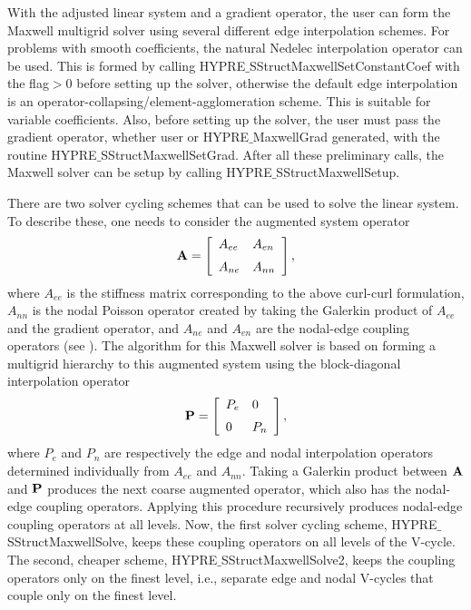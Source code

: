 With the adjusted linear system and a gradient operator, the user can form the Maxwell multigrid solver using 
several different edge interpolation schemes. For problems with smooth coefficients, the natural Nedelec
interpolation operator can be used. This is formed by calling HYPRE$\_$SStructMaxwellSetConstantCoef 
with the flag$>0$ before setting up the solver, otherwise the default edge interpolation is an
operator-collapsing/element-agglomeration scheme. This is suitable for variable coefficients.
Also, before setting up the solver, the user must pass the gradient operator, whether user or 
HYPRE$\_$MaxwellGrad generated, with the routine HYPRE$\_$SStructMaxwellSetGrad. After all these
preliminary calls, the Maxwell solver can be setup by calling HYPRE$\_$SStructMaxwellSetup.

There are two solver cycling schemes that can be used to solve the linear system. To describe these, one
needs to consider the augmented system operator
\begin{eqnarray}
\bf{A}= \left [
  \begin{array}{ll}
     A_{ee} & A_{en}  \\ \rule{0cm}{.5cm}
     A_{ne} & A_{nn}
  \end{array}
\right ],
\end{eqnarray}
where $A_{ee}$ is the stiffness matrix corresponding to the above curl-curl formulation, $A_{nn}$
is the nodal Poisson operator created by taking the Galerkin product of $A_{ee}$ and the gradient operator,
and $A_{ne}$ and $A_{en}$ are the nodal-edge coupling operators (see \cite{JonesLee_2006}). The algorithm
for this Maxwell solver is based on forming a multigrid hierarchy to this augmented system using the block-diagonal
interpolation operator 
\begin{eqnarray*}
\bf{P}= \left[  \begin{array}{ll}
            P_e & 0  \\ \rule{0cm}{.5cm}
            0   & P_n
         \end{array}
\right],
\end{eqnarray*}
where $P_e$ and $P_n$ are respectively the edge and nodal interpolation operators determined individually
from $A_{ee}$ and $A_{nn}.$ Taking a Galerkin product between $\bf{A}$ and $\bf{P}$ produces the next coarse
augmented operator, which also has the nodal-edge coupling operators. Applying this procedure recursively
produces nodal-edge coupling operators at all levels. Now, the first solver cycling scheme,
HYPRE$\_$SStructMaxwellSolve, keeps these coupling operators on all levels of the V-cycle. The second,
cheaper scheme, HYPRE$\_$SStructMaxwellSolve2, keeps the coupling operators only on the finest level, i.e.,
separate edge and nodal V-cycles that couple only on the finest level.

